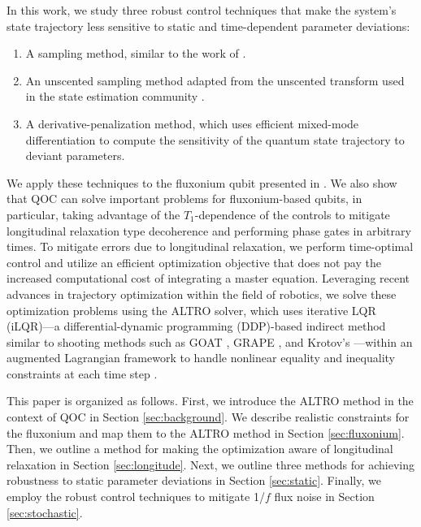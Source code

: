 In this work, we study three robust control techniques that
make the system's state trajectory less sensitive
to static and time-dependent parameter deviations:
\begin{enumerate}
  \item A sampling method, similar to the work of \cite{allen2019robust,
    carvalho2020error, reinhold2019controlling, rembold2020introduction}.
  \item An unscented sampling method adapted from the unscented transform used in the 
    state estimation community \cite{howell2020direct, julier2004unscented,
      lee2013sigma, manchester2016derivative}.
  \item A derivative-penalization method, which uses efficient mixed-mode differentiation
    to compute the sensitivity of the quantum state trajectory
    to deviant parameters.
\end{enumerate}
We apply these techniques to the fluxonium qubit presented in \cite{zhang2020universal}.
We also show that QOC can solve important problems for fluxonium-based qubits,
in particular, taking advantage of the $T_{1}$-dependence of the controls
to mitigate longitudinal relaxation type decoherence and
performing phase gates in arbitrary times.
To mitigate errors due to longitudinal
relaxation, we perform time-optimal control and
utilize an efficient optimization objective that does
not pay the increased computational cost of integrating a master equation.
Leveraging recent advances in trajectory optimization within the field of robotics, we
solve these optimization problems using the ALTRO solver, which uses iterative LQR 
(iLQR)---a differential-dynamic programming (DDP)-based indirect method similar to shooting
methods such as GOAT \cite{machnes2015gradient}, GRAPE
\cite{khaneja2005optimal, leung2017speedup}, and Krotov's \cite{goerz2019krotov}---within 
an augmented Lagrangian framework to handle nonlinear equality and inequality constraints at 
each time step \cite{howell2019altro}. 

This paper is organized as follows.
First, we introduce the ALTRO method in the context of QOC
in Section \ref{sec:background}.
We describe realistic constraints for the fluxonium and
map them to the ALTRO method in Section \ref{sec:fluxonium}. Then, we
outline a method for making the optimization aware of longitudinal
relaxation in Section \ref{sec:longitude}. Next, we outline three methods for achieving
robustness to static parameter deviations in Section \ref{sec:static}. Finally,
we employ the robust control techniques to mitigate 1/$f$ flux noise
in Section \ref{sec:stochastic}.
